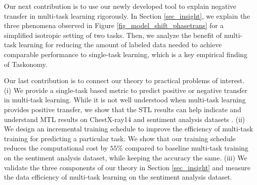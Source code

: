 Our next contribution is to use our newly developed tool to explain negative transfer in multi-task learning rigorously.
In Section \ref{sec_insight}, we explain the three phenomena observed in Figure \ref{fig_model_shift_phasetrans} for a simplified isotropic setting of two tasks.
Then, we analyze the benefit of multi-task learning for reducing the amount of labeled data needed to achieve comparable performance to single-task learning, which is a key empirical finding of Taskonomy.

Our last contribution is to connect our theory to practical problems of interest.
(i) We provide a single-task based metric to predict positive or negative transfer in multi-task learning.
While it is not well understood when multi-task learning provides positive transfer, we show that the STL results can help indicate and understand MTL results on ChestX-ray14 \cite{chexnet17} and sentiment analysis datasets \cite{LZWDA18}.
(ii) We design an incremental training schedule to improve the efficiency of multi-task training for predicting a particular task.
We show that our training schedule reduces the computational cost by $55\%$ compared to baseline multi-task training on the sentiment analysis dataset, while keeping the accuracy the same.
(iii) We validate the three components of our theory in Section \ref{sec_insight} and measure the data efficiency of multi-task learning on the sentiment analysis dataset.

